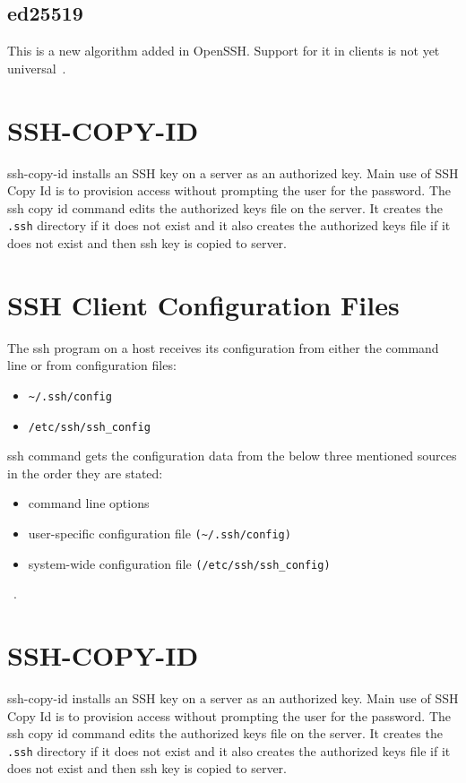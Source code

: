 \subsection{ed25519}
This is a new algorithm added in OpenSSH. Support for it in clients
is not yet universal~\cite{hid-sp18-513-sshkeyinc}. 

\section{SSH-COPY-ID}
ssh-copy-id installs an SSH key on a server as an authorized key. 
Main use of SSH Copy Id is to provision access without prompting
the user for the password. The ssh copy id command edits the 
authorized keys file on the server. It creates the \verb|.ssh| 
directory if it does not exist and it also creates the authorized 
keys file if it does not exist and then ssh key is copied to server.

\section{SSH Client Configuration Files}
The ssh program on a host receives its configuration from either
the command line or from configuration files:
\begin{itemize}
\item \verb|~/.ssh/config|
\item \verb|/etc/ssh/ssh_config|
\end{itemize}

ssh command gets the configuration data from the below three 
mentioned sources in the order they are stated:

\begin{itemize}
\item command line options
\item user-specific configuration file \verb|(~/.ssh/config)|
\item system-wide configuration file \verb|(/etc/ssh/ssh_config)|
\end{itemize}
~\cite{hid-sp18-513-sshkeyinc}. 

\section{SSH-COPY-ID}
ssh-copy-id installs an SSH key on a server as an authorized key. 
Main use of SSH Copy Id is to provision access without prompting
the user for the password. The ssh copy id command edits the 
authorized keys file on the server. It creates the \verb|.ssh| 
directory if it does not exist and it also creates the 
authorized keys file if it does not exist and then ssh key is 
copied to server.

